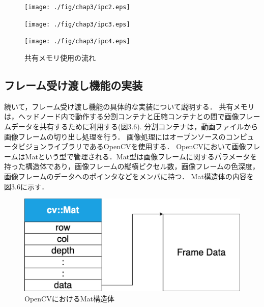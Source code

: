 \begin{figure}[H]
    \hspace*{\fill}
    \texttt{[image: ./fig/chap3/ipc2.eps]}
    \hspace*{\fill}
\end{figure}


\begin{figure}[H]
    \hspace*{\fill}
    \texttt{[image: ./fig/chap3/ipc3.eps]}
    \hspace*{\fill}
\end{figure}

\begin{figure}[H]
    \hspace*{\fill}
    \texttt{[image: ./fig/chap3/ipc4.eps]}
    \hspace*{\fill}
    \caption{共有メモリ使用の流れ}
\end{figure}

\subsection*{フレーム受け渡し機能の実装}

続いて，フレーム受け渡し機能の具体的な実装について説明する．
共有メモリは，ヘッドノード内で動作する分割コンテナと圧縮コンテナとの間で画像フレームデータを共有するために利用する(図3.6).
分割コンテナは，動画ファイルから画像フレームの切り出し処理を行う．
画像処理にはオープンソースのコンピュータビジョンライブラリであるOpenCVを使用する．
OpenCVにおいて画像フレームはMatという型で管理される．Mat型は画像フレームに関するパラメータを持った構造体であり，画像フレームの縦横ピクセル数，画像フレームの色深度，画像フレームのデータへのポインタなどをメンバに持つ．
Mat構造体の内容を図3.6に示す．

\begin{figure}[H]
    \hspace*{\fill}
    \includegraphics[width=\linewidth]{./fig/chap3/mat.eps}
    \hspace*{\fill}
    \caption{OpenCVにおけるMat構造体}
\end{figure}

